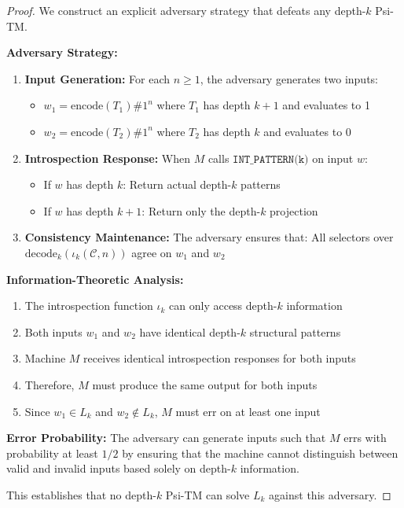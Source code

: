 \documentclass[11pt]{article}
\begin{document}
\begin{proof}
We construct an explicit adversary strategy that defeats any depth-$k$ Psi-TM.

\textbf{Adversary Strategy:}
\begin{enumerate}
\item \textbf{Input Generation:} For each $n \geq 1$, the adversary generates two inputs:
  \begin{itemize}
  \item $w_1 = \text{encode}(T_1)\#1^n$ where $T_1$ has depth $k+1$ and evaluates to 1
  \item $w_2 = \text{encode}(T_2)\#1^n$ where $T_2$ has depth $k$ and evaluates to 0
  \end{itemize}

\item \textbf{Introspection Response:} When $M$ calls $\texttt{INT\_PATTERN(k)}$ on input $w$:
  \begin{itemize}
  \item If $w$ has depth $k$: Return actual depth-$k$ patterns
  \item If $w$ has depth $k+1$: Return only the depth-$k$ projection
  \end{itemize}

\item \textbf{Consistency Maintenance:} The adversary ensures that:
All selectors over $\mathrm{decode}_k(\iota_k(\mathcal{C},n))$ agree on $w_1$ and $w_2$
\end{enumerate}

\textbf{Information-Theoretic Analysis:}
\begin{enumerate}
\item The introspection function $\iota_k$ can only access depth-$k$ information
\item Both inputs $w_1$ and $w_2$ have identical depth-$k$ structural patterns
\item Machine $M$ receives identical introspection responses for both inputs
\item Therefore, $M$ must produce the same output for both inputs
\item Since $w_1 \in L_k$ and $w_2 \notin L_k$, $M$ must err on at least one input
\end{enumerate}

\textbf{Error Probability:}
The adversary can generate inputs such that $M$ errs with probability at least $1/2$ by ensuring that the machine cannot distinguish between valid and invalid inputs based solely on depth-$k$ information.

This establishes that no depth-$k$ Psi-TM can solve $L_k$ against this adversary.
\end{proof}
\end{document}
